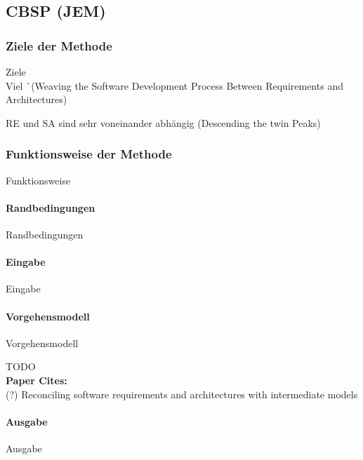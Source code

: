 \subsection{CBSP (JEM)}\label{cbsp}

\subsubsection{Ziele der Methode}

Ziele \\

Viel ^^ (Weaving the Software Development Process Between Requirements and Architectures)

RE und SA sind sehr voneinander abhängig (Descending the twin Peaks)

\subsubsection{Funktionsweise der Methode}

Funktionsweise

\paragraph{Randbedingungen}

Randbedingungen


\paragraph{Eingabe}

Eingabe


\paragraph{Vorgehensmodell}

Vorgehensmodell

TODO \\


\textbf{Paper Cites:} \\
(?) Reconciling software requirements and architectures with intermediate models


\paragraph{Ausgabe}

Ausgabe
